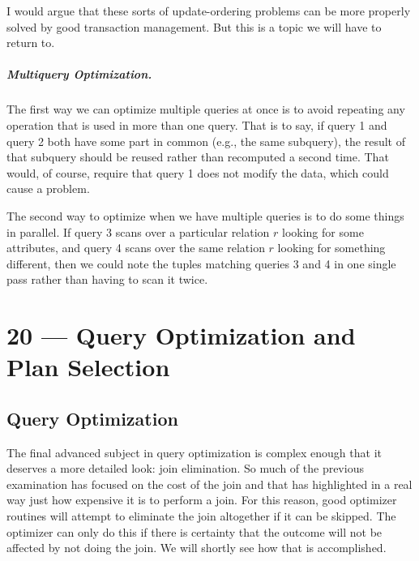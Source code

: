 \documentclass[a4paper]{report}
\begin{document}
I would argue that these sorts of update-ordering problems can be more properly solved by good transaction management. But this is a topic we will have to return to.

\paragraph{Multiquery Optimization.}

The first way we can optimize multiple queries at once is to avoid repeating any operation that is used in more than one query. That is to say, if query 1 and query 2 both have some part in common (e.g., the same subquery), the result of that subquery should be reused rather than recomputed a second time. That would, of course, require that query 1 does not modify the data, which could cause a problem.

The second way to optimize when we have multiple queries is to do some things in parallel. If query 3 scans over a particular relation $r$ looking for some attributes, and query 4 scans over the same relation $r$ looking for something different, then we could note the tuples matching queries 3 and 4 in one single pass rather than having to scan it twice.









\chapter*{20 --- Query Optimization and Plan Selection}


\section*{Query Optimization}

The final advanced subject in query optimization is complex enough that it deserves a more detailed look: join elimination. So much of the previous examination has focused on the cost of the join and that has highlighted in a real way just how expensive it is to perform a join. For this reason, good optimizer routines will attempt to eliminate the join altogether if it can be skipped. The optimizer can only do this if there is certainty that the outcome will not be affected by not doing the join. We will shortly see how that is accomplished.
\end{document}
